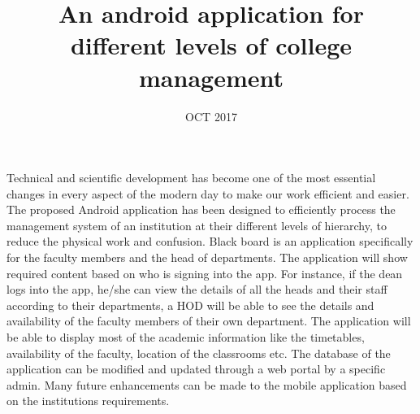 \documentclass[BTech]{srmuthesis}
\begin{document}

\title{An android application for different levels of college management} %

\firstauthorregno{[Reg No: RA1511003020329]}
\secondauthorregno{[Reg No: RA1511003020375]}
\thirdauthorregno{[Reg No: RA1511003020344]}
\fourthauthorregno{[Reg No: RA1511003020383]}
\date{OCT 2017} %

\maketitle
\certificate





\abstract
\begin{doublespacing}
\large\noindent Technical and scientific development has become one of the most essential changes in every aspect of the modern
day to make our work efficient and easier. The proposed
Android application has been designed to efficiently process the
management system of an institution at their different levels
of hierarchy, to reduce the physical work and confusion. Black
board is an application specifically for the faculty members and
the head of departments. The application will show required
content based on who is signing into the app. For instance, if
the dean logs into the app, he/she can view the details of all the
heads and their staff according to their departments, a HOD will
be able to see the details and availability of the faculty members
of their own department. The application will be able to display
most of the academic information like the timetables, availability
of the faculty, location of the classrooms etc. The database of the application can be modified and updated through a web portal
by a specific admin. Many future enhancements can be made to
the mobile application based on the institutions requirements.\\
\end{doublespacing}
\end{document}
